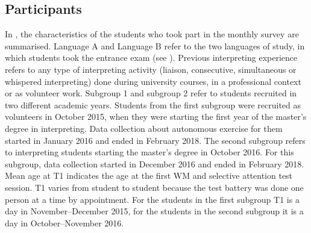 \documentclass[output=paper]{../langscibook}
\begin{document}
\subsection{Participants}

In , the characteristics of the students who took part in the monthly survey are summarised. Language A and Language B refer to the two languages of study, in which students took the entrance exam (see ). Previous interpreting experience refers to any type of interpreting activity (liaison, consecutive, simultaneous or whispered interpreting) done during university courses, in a professional context or as volunteer work. Subgroup 1 and subgroup 2 refer to students recruited in two different academic years. Students from the first subgroup were recruited as volunteers in October 2015, when they were starting the first year of the master’s degree in interpreting. Data collection about autonomous exercise for them started in January 2016 and ended in February 2018. The second subgroup refers to interpreting students starting the master’s degree in October 2016. For this subgroup, data collection started in December 2016 and ended in February 2018. Mean age at T1 indicates the age at the first WM and selective attention test session. T1 varies from student to student because the test battery was done one person at a time by appointment. For the students in the first subgroup T1 is a day in November--December 2015, for the students in the second subgroup it is a day in October--November 2016.
\end{document}

